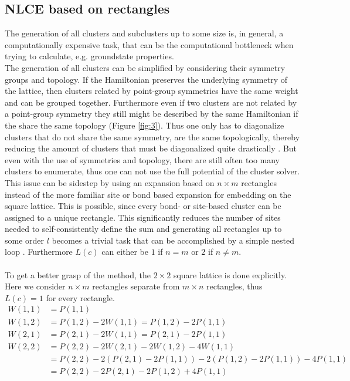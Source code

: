 \documentclass{article}
\begin{document}
\subsection{NLCE based on rectangles}
The generation of all clusters and subclusters up to some size is, in
general, a computationally expensive task, that can be the
computational bottleneck when trying to calculate, e.g. groundstate
properties.\\
The generation of all clusters can be simplified by considering their
symmetry groups and topology. If the Hamiltonian preserves the underlying symmetry of the lattice,
then clusters related by point-group symmetries have the same weight
and can be grouped together. Furthermore even if two clusters are not
related by a point-group symmetry they still might be described by the
same Hamiltonian if the share the same topology (Figure \ref{fig:3}). Thus
one only has to diagonalize clusters that do not share the same
symmetry, are the same topologically, thereby reducing the amount of
clusters that must be diagonalized quite drastically \cite{Rigol}.
But even with the use of symmetries and topology, there are still
often too many clusters to enumerate, thus one can not use the full
potential of the cluster solver.\\
This issue can be sidestep by using an expansion based on $n \times m$
rectangles instead of the more familiar site or bond based
expansion for embedding on the square lattice. This is possible, since every bond- or site-based cluster
can be assigned to a unique rectangle. This significantly reduces the
number of sites needed to self-consistently define the sum and
generating all rectangles up to some order $l$ becomes a
trivial task that can be accomplished by a simple nested
loop \cite{Kallin}. Furthermore $L(c)$ can either be $1$ if $n=m$ or $2$ if $n
\neq m$.\\
\\
To get a better grasp of the method, the $2 \times 2$ square lattice
is done explicitly. Here we consider $ n \times m$ rectangles separate from
$m \times n$ rectangles, thus $L(c) = 1$ for every rectangle.
\begin{align*}
W(1,1) &= P(1,1)\\
W(1,2) &= P(1,2) - 2W(1,1) = P(1,2) -2 P(1,1)\\
W(2,1) &= P(2,1) - 2W(1,1) = P(2,1) -2 P(1,1)\\
W(2,2) &= P(2,2) -2 W(2,1) -2 W(1,2) -4 W(1,1)\\
&= P(2,2) - 2 (P(2,1) -2
         P(1,1)) - 2(P(1,2) -2 P(1,1)) - 4 P(1,1)\\
&= P(2,2) -2 P(2,1) - 2 P(1,2) + 4 P(1,1)
\end{align*}
\end{document}
